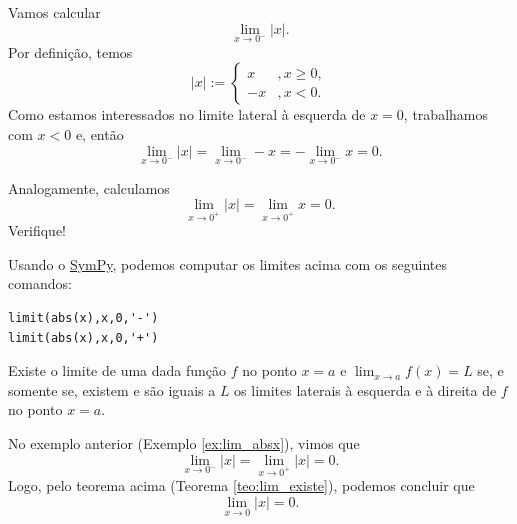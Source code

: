 \begin{exer}\label{ex:lim_absx}
  Vamos calcular
  \begin{equation}
    \lim_{x\to 0^-} |x|.
  \end{equation}
  Por definição, temos
  \begin{equation}
    |x| := \left\{
      \begin{array}{ll}
        x &, x\geq 0,\\
        -x &, x< 0.
      \end{array}
    \right.
  \end{equation}
  Como estamos interessados no limite lateral à esquerda de $x=0$, trabalhamos com $x<0$ e, então
  \begin{equation}
    \lim_{x\to 0^-} |x| = \lim_{x\to 0^-} -x = -\lim_{x\to 0^-} x = 0.
  \end{equation}
  
  Analogamente, calculamos
  \begin{equation}
    \lim_{x\to 0^+} |x| = \lim_{x\to 0^+} x = 0.
  \end{equation}
  Verifique!

  \ifispython
  Usando o \href{https://www.sympy.org}{SymPy}, podemos computar os limites acima com os seguintes comandos:
\begin{verbatim}
limit(abs(x),x,0,'-')
limit(abs(x),x,0,'+')
\end{verbatim}
  \fi
\end{exer}

\begin{teo}\label{teo:lim_existe}
  Existe o limite de uma dada função $f$ no ponto $x=a$ e $\lim_{x\to a} f(x) = L$ se, e somente se, existem e são iguais a $L$ os limites laterais à esquerda e à direita de $f$ no ponto $x=a$.
\end{teo}

\begin{exer}
  No exemplo anterior (Exemplo \ref{ex:lim_absx}), vimos que
  \begin{equation}
    \lim_{x\to 0^-} |x| = \lim_{x\to 0^+} |x| = 0.
  \end{equation}
  Logo, pelo teorema acima (Teorema \ref{teo:lim_existe}), podemos concluir que
  \begin{equation}
    \lim_{x\to 0} |x| = 0.
  \end{equation}
\end{exer}

